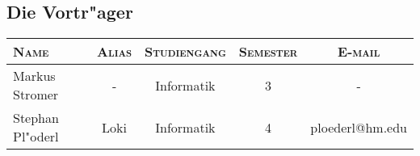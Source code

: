 \subsection{Die Vortr"ager}
\begin{tabular}{|l|c|c|c|c|}
\hline
\textsc{Name} & \textsc{Alias} & \textsc{Studiengang} & \textsc{Semester} & \textsc{E-mail} \\ \hline
Markus Stromer & - & Informatik & 3 & - \\ \hline
Stephan Pl"oderl & Loki & Informatik & 4 & ploederl@hm.edu \\ \hline
\end{tabular}